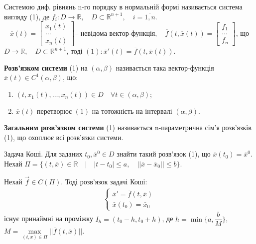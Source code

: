 \documentclass[14pt,a4paper]{scrartcl}
\theoremstyle{definition}
\theoremstyle{remark}
\theoremstyle{definition}
\theoremstyle{definition}
\begin{document}
 Системою диф. рівнянь n-го порядку в нормальній формі називається система вигляду (1), де $ f_i : D \to \mathbb{R}, \quad D \subset \mathbb{R}^{n+1 }, \quad i = \overline{1, n}$.
\look
\[
      \overline{x}(t) = \left[\begin{array}{l}
      x_1(t)    \\
      \dots     \\
      x_n(t)
      \end{array}\right] \text{-- невідома вектор-функція}, \quad
      \overline{f}(t, \overline{x}(t)) = \left[\begin{array}{l}
      f_1     \\
      \dots  \\
      f_n
      \end{array}\right] \text{, що}
\]
$D \rightarrow \mathbb{R}, \quad D \subset \mathbb{R}^{n+1}$, тоді $(1): \overline{x}'(t) = \overline{f}(t, \overline{x}(t))$.


\def\rect{\textbf{П}}
\bd
\textbf{Розв'язком системи} (1) на $(\alpha , \beta)$ називається така вектор-функція $\overline{x} (t) \in C^1(\alpha , \beta)$, що:
\begin{enumerate}
  \item $(t, x_1(t), \dots, x_n(t)) \in D \quad \forall t \in (\alpha, \beta)$;
  \item $\overline{x}(t)$  перетворює $(1)$ на тотожність на інтервалі $(\alpha, \beta)$.
\end{enumerate}

\textbf{Загальним розв'язком системи}  (1) називається n-параметрична сім'я розв'язків (1), що охоплює всі розв'язки системи.
\ed

Задача Коші. Для заданих $t_0, \overline{x}^{0} \in D$ знайти такий розв'язок (1), що $\overline{x} (t_0) = \overline{x}^{0}$.
Нехай $\Pi = \{(t, \overline{x}) \in \mathbb{R} \quad \big| \quad |t-t_0| \leq a, \quad ||\overline{x} - \overline{x}_0|| \leq b \}$.

\begin{boxteo}
Нехай $\vec{f} \in C(\Pi)$. Тоді розв'язок задачі Коші:
\begin{gather*}
  \begin{cases}
    \overline{x}' = \overline{f}(t, \overline{x}) \\
    \overline{x}(t_0) = \overline{x}_0
  \end{cases}
\end{gather*}
існує принаймні на проміжку $I_h = (t_0 - h, t_0 + h)$, де $h = \min\{{a, \dfrac{b}{M}}\}$, \\ $M = \max\limits_{(t, x) \in \Pi} {||\overline{f}(t, \overline{x})||}$.
\end{boxteo}
\end{document}
